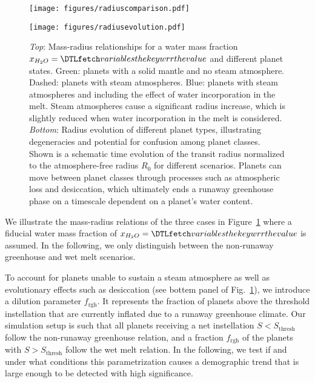 \documentclass[twocolumn]{aastex631}
\begin{document}
\begin{figure}
    \begin{centering}
        \texttt{[image: figures/radiuscomparison.pdf]}
    \end{centering}
    \begin{centering}
        \texttt{[image: figures/radiusevolution.pdf]}
        \caption{
            \textit{Top}: Mass-radius relationships for a water mass fraction $x_{H_2O}= \var{wrr}$ and different planet states. Green: planets with a solid mantle and no steam atmosphere. Dashed: planets with steam atmospheres. Blue: planets with steam atmospheres and including the effect of water incorporation in the melt.
                Steam atmospheres cause a significant radius increase, which is slightly reduced when water incorporation in the melt is considered.
            \textit{Bottom}: Radius evolution of different planet types, illustrating degeneracies and potential for confusion among planet classes. Shown is a schematic time evolution of the transit radius normalized to the atmosphere-free radius $R_\mathrm{0}$ for different scenarios. Planets can move between planet classes through processes such as atmospheric loss and desiccation, which ultimately ends a runaway greenhouse phase on a timescale dependent on a planet's water content.}
        \label{fig:radiusevolution}
    \end{centering}
\end{figure}
We illustrate the mass-radius relations of the three cases in Figure~\ref{fig:radiusevolution} where a fiducial water mass fraction of $x_{H_2O}= \var{wrr}$ is assumed.
In the following, we only distinguish between the non-runaway greenhouse and wet melt scenarios.

To account for planets unable to sustain a steam atmosphere as well as evolutionary effects such as desiccation (see bottem panel of Fig.~\ref{fig:radiusevolution}), we introduce a dilution parameter $f_\mathrm{rgh}$.
It represents the fraction of planets above the threshold instellation that are currently inflated due to a runaway greenhouse climate.
Our simulation setup is such that all planets receiving a net instellation $S < S_\mathrm{thresh}$ follow the non-runaway greenhouse relation, and a fraction $f_\mathrm{rgh}$ of the planets with $S > S_\mathrm{thresh}$ follow the wet melt relation.
In the following, we test if and under what conditions this parametrization causes a demographic trend that is large enough to be detected with high significance.
\end{document}
